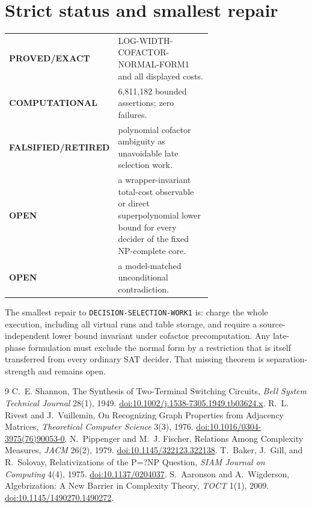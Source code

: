 \documentclass[11pt]{article}
\newcommand{\Status}[1]{\textbf{#1}}
\begin{document}
\section{Strict status and smallest repair}
\begin{center}
\begin{tabular}{lp{0.67\linewidth}}
\toprule
\Status{PROVED/EXACT} & LOG-WIDTH-COFACTOR-NORMAL-FORM1 and all displayed
costs.\\
\Status{COMPUTATIONAL} & 6,811,182 bounded assertions; zero failures.\\
\Status{FALSIFIED/RETIRED} & polynomial cofactor ambiguity as unavoidable
late selection work.\\
\Status{OPEN} & a wrapper-invariant total-cost observable or direct
superpolynomial lower bound for every decider of the fixed NP-complete core.\\
\Status{OPEN} & a model-matched unconditional contradiction.\\
\bottomrule
\end{tabular}
\end{center}
The smallest repair to \texttt{DECISION-SELECTION-WORK1} is: charge the whole
execution, including all virtual runs and table storage, and require a
source-independent lower bound invariant under cofactor precomputation. Any
late-phase formulation must exclude the normal form by a restriction that is
itself transferred from every ordinary SAT decider. That missing theorem is
separation-strength and remains open.

\begin{thebibliography}{9}
C.~E. Shannon, The Synthesis of Two-Terminal Switching Circuits,
\emph{Bell System Technical Journal} 28(1), 1949.
\href{https://doi.org/10.1002/j.1538-7305.1949.tb03624.x}{doi:10.1002/j.1538-7305.1949.tb03624.x}.
R.~L. Rivest and J.~Vuillemin, On Recognizing Graph Properties from
Adjacency Matrices, \emph{Theoretical Computer Science} 3(3), 1976.
\href{https://doi.org/10.1016/0304-3975(76)90053-0}{doi:10.1016/0304-3975(76)90053-0}.
N.~Pippenger and M.~J. Fischer, Relations Among Complexity Measures,
\emph{JACM} 26(2), 1979.
\href{https://doi.org/10.1145/322123.322138}{doi:10.1145/322123.322138}.
T.~Baker, J.~Gill, and R.~Solovay, Relativizations of the P=?NP Question,
\emph{SIAM Journal on Computing} 4(4), 1975.
\href{https://doi.org/10.1137/0204037}{doi:10.1137/0204037}.
S.~Aaronson and A.~Wigderson, Algebrization: A New Barrier in Complexity
Theory, \emph{TOCT} 1(1), 2009.
\href{https://doi.org/10.1145/1490270.1490272}{doi:10.1145/1490270.1490272}.
\end{thebibliography}

\end{document}

